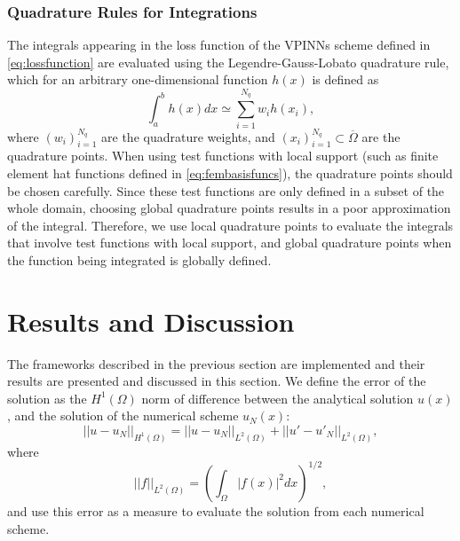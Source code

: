 \subsubsection{Quadrature Rules for Integrations}\label{sec:quadraturerules}
The integrals appearing in the loss function of the VPINNs scheme defined in \eqref{eq:lossfunction} are evaluated using the Legendre-Gauss-Lobato quadrature rule, which for an arbitrary one-dimensional function $h(x)$ is defined as
\begin{equation}
    \label{eq:quadrature}
    \int_{a}^{b}h(x)dx \simeq \sum_{i=1}^{N_q}{w_i h(x_i)},
\end{equation}
where ${(w_i)}_{i=1}^{N_q}$ are the quadrature weights, and ${(x_i)}_{i=1}^{N_q} \subset \overline{\Omega}$ are the quadrature points. When using test functions with local support (such as finite element hat functions defined in \eqref{eq:fembasisfuncs}), the quadrature points should be chosen carefully. Since these test functions are only defined in a subset of the whole domain, choosing global quadrature points results in a poor approximation of the integral. Therefore, we use local quadrature points to evaluate the integrals that involve test functions with local support, and global quadrature points when the function being integrated is globally defined.

\section{Results and Discussion}\label{sec:results}
The frameworks described in the previous section are implemented and their results are presented and discussed in this section. We define the error of the solution as the $H^1{(\Omega)}$ norm of difference between the analytical solution $u(x)$, and the solution of the numerical scheme $u_N(x)$:
\begin{equation}
    \label{eq:H1error}
    ||u - u_N||_{H^1{(\Omega)}} = ||u - u_N||_{L^2{(\Omega)}} + ||u' - u'_N||_{L^2{(\Omega)}},
\end{equation}
where
\begin{equation}
    \label{eq:L2error}
    ||f||_{L^2{(\Omega)}} = \left( \int_{\Omega}{|f(x)|^2dx} \right) ^{1/2},
\end{equation}
and use this error as a measure to evaluate the solution from each numerical scheme.

